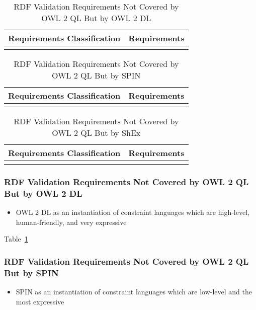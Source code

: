 \documentclass{llncs}
\newcommand{\hr}{\hline\noalign{\smallskip}} %
\begin{document}
\begin{table}
\caption{RDF Validation Requirements Not Covered by OWL 2 QL But by OWL 2 DL}
\label{tab:RequirementsCoveredOWL2DL}
\centering
\begin{tabular}{ll}
\hr
Requirements Classification & Requirements \\
\hr

\hr
\end{tabular}
\end{table}

\begin{table}
\caption{RDF Validation Requirements Not Covered by OWL 2 QL But by SPIN}
\label{tab:RequirementsCoveredSPIN}
\centering
\begin{tabular}{ll}
\hr
Requirements Classification & Requirements \\
\hr

\hr
\end{tabular}
\end{table}

\begin{table}
\caption{RDF Validation Requirements Not Covered by OWL 2 QL But by ShEx}
\label{tab:RequirementsCoveredShEx}
\centering
\begin{tabular}{ll}
\hr
Requirements Classification & Requirements \\
\hr

\hr
\end{tabular}
\end{table}

\subsubsection{RDF Validation Requirements Not Covered by OWL 2 QL But by OWL 2 DL}

\begin{itemize}
	\item OWL 2 DL as an instantiation of constraint languages which are high-level, human-friendly, and very expressive 
\end{itemize}

Table~\ref{tab:RequirementsCoveredOWL2DL}

\subsubsection{RDF Validation Requirements Not Covered by OWL 2 QL But by SPIN}

\begin{itemize}
	\item SPIN as an instantiation of constraint languages which are low-level and the most expressive 
\end{itemize}
\end{document}
